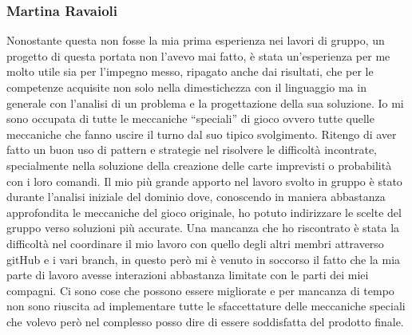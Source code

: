 \subsubsection{Martina Ravaioli}

Nonostante questa non fosse la mia prima esperienza nei lavori di gruppo, 
un progetto di questa portata non l'avevo mai fatto, è stata un’esperienza per me molto utile 
sia per l’impegno messo, ripagato anche dai risultati, che per le competenze acquisite 
non solo nella dimestichezza con il linguaggio ma in generale con l’analisi di un problema e la progettazione della sua soluzione. 
Io mi sono occupata di tutte le meccaniche “speciali” di gioco ovvero 
tutte quelle meccaniche che fanno uscire il turno dal suo tipico svolgimento. 
Ritengo di aver fatto un buon uso di pattern e strategie nel risolvere le difficoltà incontrate, 
specialmente nella soluzione della creazione delle carte imprevisti o probabilità con i loro comandi.
Il mio più grande apporto nel lavoro svolto in gruppo è stato durante l’analisi iniziale del dominio dove, 
conoscendo in maniera abbastanza approfondita le meccaniche del gioco originale, ho potuto indirizzare 
le scelte del gruppo verso soluzioni più accurate.
Una mancanza che ho riscontrato è stata la difficoltà nel coordinare il mio lavoro 
con quello degli altri membri attraverso gitHub e i vari branch, in questo però mi è venuto in soccorso il fatto che 
la mia parte di lavoro avesse interazioni abbastanza limitate con le parti dei miei compagni.
Ci sono cose che possono essere migliorate e per mancanza di tempo non sono riuscita ad implementare 
tutte le sfaccettature delle meccaniche speciali che volevo però nel complesso 
posso dire di essere soddisfatta del prodotto finale. 
